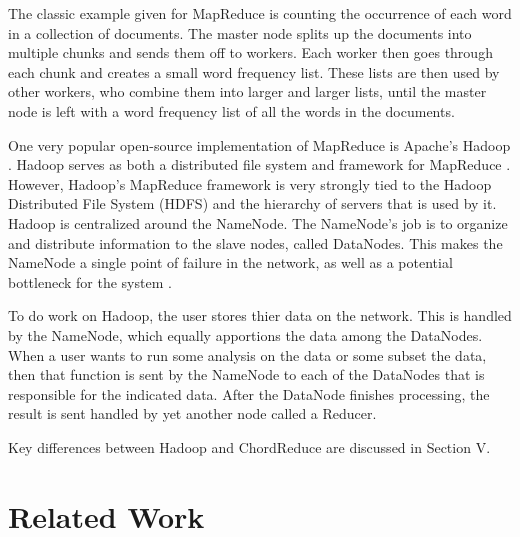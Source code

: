 \documentclass[conference, compsocconf, letterpaper]{IEEEtran}
\begin{document}
The classic example given for MapReduce is counting the occurrence of each word in a collection of documents.  The master node splits up the documents into multiple chunks and sends them off to workers.  Each worker then goes through each chunk and creates a small word frequency list.  These lists are then used by other workers, who combine them into larger and larger lists, until the master node is left with a word frequency list of all the words in the documents. 



 

One very popular open-source implementation of MapReduce is Apache's Hadoop \cite{Hadoop}.  Hadoop serves as both a distributed file system and framework for MapReduce \cite{shvachko2010hadoop}.  However,  Hadoop's MapReduce framework is very strongly tied to the Hadoop Distributed File System (HDFS) and the hierarchy of servers that is used by it.  Hadoop is centralized around the NameNode.  The NameNode's job is to organize and distribute information to the slave nodes, called DataNodes.  This makes the NameNode a single point of failure \cite{shvachko2010hadoop} in the network, as well as a potential bottleneck for the system \cite{hadoop-bottle}.

To do work on Hadoop, the user stores thier data on the network.  This is handled by the NameNode, which equally apportions the data among the DataNodes.  When a user wants to run some analysis on the data or some subset the data, then that function is sent by the NameNode to each of the DataNodes that is responsible for the indicated data.   After the DataNode finishes processing, the result is sent handled by yet another node called a Reducer.

Key differences between Hadoop and ChordReduce are discussed in Section V.


\section{Related Work}
\end{document}

